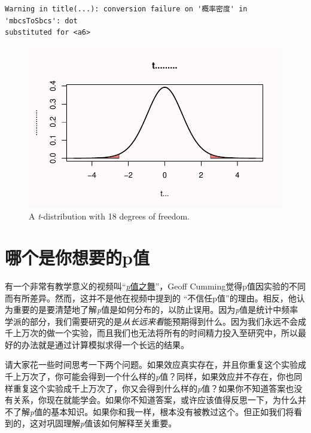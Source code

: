 \documentclass[
  letterpaper,
  DIV=11,
  numbers=noendperiod]{scrreprt}
\begin{document}
\begin{verbatim}
Warning in title(...): conversion failure on '概率密度' in 'mbcsToSbcs': dot
substituted for <a6>
\end{verbatim}

\begin{figure}

{\centering \includegraphics[width=1\textwidth,height=\textheight]{01-pvalue_files/figure-pdf/fig-tdist-1.pdf}

}

\caption{\label{fig-tdist}A \emph{t}-distribution with 18 degrees of
freedom.}

\end{figure}

\hypertarget{sec-whichpexpect}{%
\section{哪个是你想要的p值}\label{sec-whichpexpect}}

有一个非常有教学意义的视频叫``\href{https://www.youtube.com/watch?v=5OL1RqHrZQ8}{\emph{p}值之舞}''，Geoff
Cumming觉得p值因实验的不同而有所差异。然而，这并不是他在视频中提到的
``不信任p值''的理由。相反，他认为重要的是要清楚地了解\emph{p}值是如何分布的，以防止误用。因为\emph{p}值是统计中频率学派的部分，我们需要研究的是\emph{从长远来看}能预期得到什么。因为我们永远不会成千上万次的做一个实验，而且我们也无法将所有的时间精力投入至研究中，所以最好的办法就是通过计算模拟求得一个长远的结果。

请大家花一些时间思考一下两个问题。如果效应真实存在，并且你重复这个实验成千上万次了，你可能会得到一个什么样的\emph{p}值？同样，如果效应并不存在，你也同样重复这个实验成千上万次了，你又会得到什么样的\emph{p}值？如果你不知道答案也没有关系，你现在就能学会。如果你不知道答案，或许应该值得反思一下，为什么并不了解\emph{p}值的基本知识。如果你和我一样，根本没有被教过这个。但正如我们将看到的，这对巩固理解\emph{p}值该如何解释至关重要。
\end{document}

